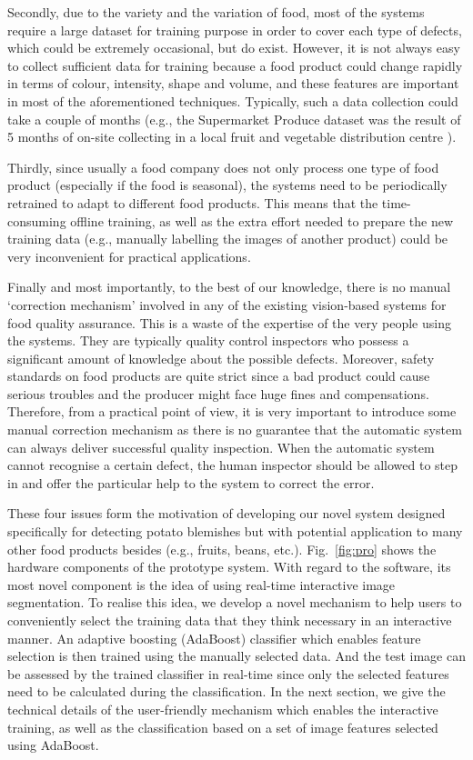 \documentclass[twocolumn]{svjour3}          %
\begin{document}
Secondly, due to the variety and the variation of food, most of the systems require a large dataset for training purpose in order to cover each type of defects, which could be extremely occasional, but do exist. However, it is not always easy to collect sufficient data for training because a food product could change rapidly in terms of colour, intensity, shape and volume, and these features are important in most of the aforementioned techniques. Typically, such a data collection could take a couple of months (e.g., the Supermarket Produce dataset was the result of 5 months of on-site collecting in a local fruit and vegetable distribution centre \cite{RA10}).

Thirdly, since usually a food company does not only process one type of food product (especially if the food is seasonal), the systems need to be periodically retrained to adapt to different food products. This means that the time-consuming offline training, as well as the extra effort needed to prepare the new training data (e.g., manually labelling the images of another product) could be very inconvenient for practical applications.

Finally and most importantly, to the best of our knowledge, there is no manual `correction mechanism' involved in any of the existing vision-based systems for food quality assurance. This is a waste of the expertise of the very people using the systems. They are typically quality control inspectors who possess a significant amount of knowledge about the possible defects. Moreover, safety standards on food products are quite strict since a bad product could cause serious troubles and the producer might face huge fines and compensations. Therefore, from a practical point of view, it is very important to introduce some manual correction mechanism as there is no guarantee that the automatic system can always deliver successful quality inspection. When the automatic system cannot recognise a certain defect, the human inspector should be allowed to step in and offer the particular help to the system to correct the error. 

These four issues form the motivation of developing our novel system designed specifically for detecting potato blemishes but with potential application to many other food products besides (e.g., fruits, beans, etc.). Fig.~\ref{fig:pro} shows the hardware components of the prototype system. With regard to the software, its most novel component is the idea of using real-time interactive image segmentation. To realise this idea, we develop a novel mechanism to help users to conveniently select the training data that they think necessary in an interactive manner. An adaptive boosting (AdaBoost) classifier \cite{SR99} which enables feature selection is then trained using the manually selected data. And the test image can be assessed by the trained classifier in real-time since only the selected features need to be calculated during the classification. In the next section, we give the technical details of the user-friendly mechanism which enables the interactive training, as well as the classification based on a set of image features selected using AdaBoost. 
\end{document}
